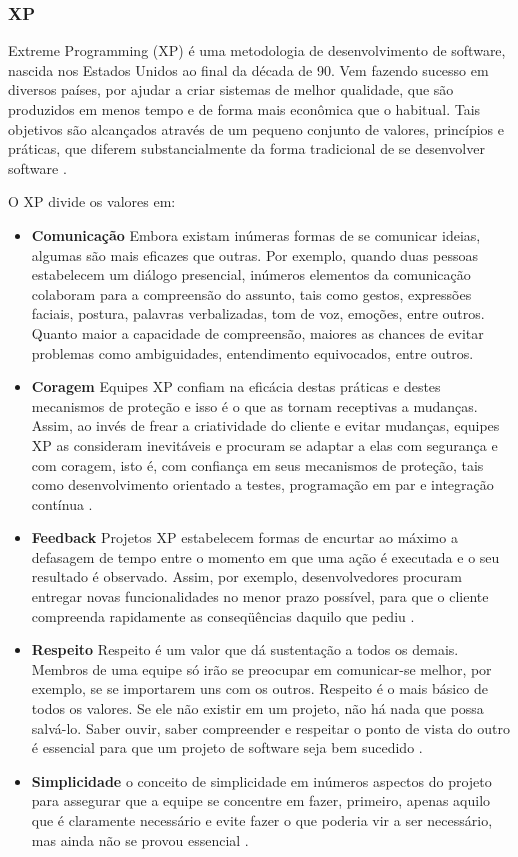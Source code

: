 \documentclass{acm_proc_article-sp}
\begin{document}
\subsubsection{XP}
Extreme Programming (XP) é uma metodologia de desenvolvimento de software, nascida nos Estados Unidos ao final da década de 90. Vem fazendo sucesso em diversos países, por ajudar a criar sistemas de melhor qualidade, que são produzidos em menos tempo e de forma mais econômica que o habitual. Tais objetivos são alcançados através de um pequeno conjunto de valores, princípios e práticas, que diferem substancialmente da forma tradicional de se desenvolver software \cite{xp:agil}.

O XP divide os valores em:

\begin{itemize}
\item \textbf{Comunicação} Embora existam inúmeras formas de se comunicar ideias, algumas são mais eficazes que outras. Por exemplo, quando duas pessoas estabelecem um diálogo presencial, inúmeros elementos da comunicação colaboram para a compreensão do assunto, tais como gestos, expressões faciais, postura, palavras verbalizadas, tom de voz, emoções, entre outros. Quanto maior a capacidade de compreensão, maiores as chances de evitar problemas como ambiguidades, entendimento equivocados, entre outros\cite{xp:agil}.
\item \textbf{Coragem} Equipes XP confiam na eficácia destas práticas e destes mecanismos de proteção e isso é o que as tornam receptivas a mudanças. Assim, ao invés de frear a criatividade do cliente e evitar mudanças, equipes XP as consideram inevitáveis e procuram se adaptar a elas com segurança e com coragem, isto é, com confiança em seus mecanismos de proteção, tais como desenvolvimento orientado a testes, programação em par e integração contínua \cite{xp:agil}.
\item \textbf{Feedback} Projetos XP estabelecem formas de encurtar ao máximo a defasagem de tempo entre o momento em que uma ação é executada e o seu resultado é observado. Assim, por exemplo, desenvolvedores procuram entregar novas funcionalidades no menor prazo possível, para que o cliente compreenda rapidamente as conseqüências daquilo que pediu \cite{xp:agil}.
\item \textbf{Respeito} Respeito é um valor que dá sustentação a todos os demais. Membros de uma equipe só irão se preocupar em comunicar-se melhor, por exemplo, se se importarem uns com os outros. Respeito é o mais básico de todos os valores. Se ele não existir em um projeto, não há nada que possa salvá-lo. Saber ouvir, saber compreender e respeitar o ponto de vista do outro é essencial para que um projeto de software seja bem sucedido \cite{xp:agil}.
\item \textbf{Simplicidade} o conceito de simplicidade em inúmeros aspectos do projeto para assegurar que a equipe se concentre em fazer, primeiro, apenas aquilo que é claramente necessário e evite fazer o que poderia vir a ser necessário, mas ainda não se provou essencial \cite{xp:agil}.
\end{itemize}
\end{document}
